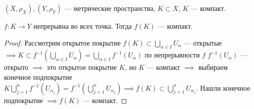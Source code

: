 \begin{theorem}
    $(X, \rho_X), (Y, \rho_Y)$ --- метрические пространства, $K \subset X$,  $K$ --- компакт.

    $f\!: K \to Y$ непрерывна во всех точка. Тогда  $f(K)$ --- компакт.
\end{theorem}
\begin{proof}
    Рассмотрим открытое покрытие $f(K) \subset \bigcup\limits_{\alpha \in I} U_\alpha$ --- открытые $\implies K \subset f^{-1}(\bigcup\limits_{\alpha \in I} U_\alpha) = \bigcup\limits_{\alpha \in I} f^{-1}(U_\alpha)$ по непрерывности $f$  $f^{-1}(U_\alpha)$ --- открыто  $\implies$ это открытое покрытие  $K$, но  $K$ --- компакт  $\implies$ выбираем конечное подпокрытие  $K \bigcup\limits_{j=1}^n f^{-1}(U_{\alpha_j}) = f^{-1}(\bigcup\limits_{j=1}^n U_{\alpha_j}) \implies f(K) \subset \bigcup\limits_{j=1}^n U_{\alpha_j}$. Нашли конечное подпокрытие  $\implies f(K)$ --- компакт.
\end{proof}

